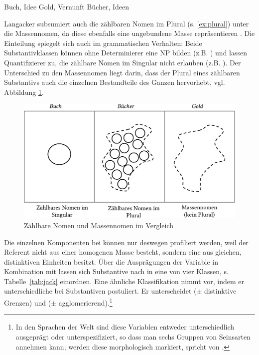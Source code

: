 \begin{exe}
	\ex \label{ex:zaehlbarkeit}
	\begin{xlist}
		\ex \label{ex:count} Buch, Idee
 		\ex \label{ex:mass} Gold, Vernunft
 	 	\ex \label{ex:plural} Bücher, Ideen 
 			\end{xlist}
\end{exe}

\noindent
Langacker subsumiert auch die zählbaren Nomen im Plural (s. \ref{ex:plural}) unter die Massennomen, da diese ebenfalls eine ungebundene Masse repräsentieren \parencite[77]{Langacker1991}. Die Einteilung spiegelt sich auch im grammatischen Verhalten: Beide Substantivklassen können ohne Determinierer eine NP bilden (z.B. ) und lassen Quantifizierer zu, die zählbare Nomen im Singular nicht erlauben (z.B. ). Der Unterschied zu den Massennomen liegt darin, dass der Plural eines zählbaren Substantivs auch die einzelnen Bestandteile des Ganzen hervorhebt, vgl. Abbildung \ref{abb:langacker-nomen}.

\begin{figure}[h]
\begin{center}
\includegraphics[width=\textwidth]{images/langacker.pdf}
\caption {Zählbare Nomen und Massennomen im Vergleich \\ \parencite[][78]{Langacker1991}}
\label{abb:langacker-nomen}
\end{center}
\end{figure}


Die einzelnen Komponenten bei  können nur deswegen profiliert werden, weil der Referent nicht aus einer homogenen Masse besteht, sondern eine  \parencite[18]{Jackendoff1991} aus gleichen, distinktiven Einheiten besitzt. Über die Ausprägungen der Variable  in Kombination mit  lassen sich Substantive nach \textcite[20]{Jackendoff1991} in eine von vier Klassen, s. Tabelle~\ref{tab:jack} einordnen. Eine ähnliche Klassifikation nimmt \textcite{Rijkhoff1991,Rijkhoff2002} vor, indem er  unterschiedliche  bei Substantiven postuliert. 
Er unterscheidet  ($\pm$ distinktive Grenzen) und  ($\pm$ agglomerierend).\footnote{In den Sprachen der Welt sind diese Variablen entweder unterschiedlich ausgeprägt oder unterspezifiziert, so dass man sechs Gruppen von Seinsarten annehmen kann; werden diese morphologisch markiert, spricht \textcite[121]{Rijkhoff2002} von .}

